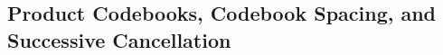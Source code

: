 \documentclass[journal]{IEEEtran}
\newcommand{\ZZ}{\mathbb{Z}}
\newcommand{\RR}{\mathbb{R}}
\newcommand{\eps}{\varepsilon}
\newcommand{\m}{\mathcal}
\newcommand{\HR}{\mathrm{High-Rate}}
\begin{document}
\medskip



\subsection{Product Codebooks, Codebook Spacing, and Successive Cancellation}
\label{subsec:SIC}
\end{document}
